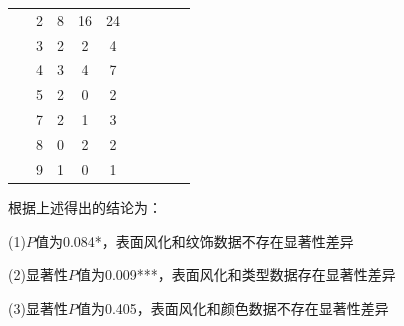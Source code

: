 \documentclass[UTF8]{ctexart}
\begin{document}
\begin{table}[H]
\begin{tabular}{|c|c|c|c|c|c|c|c|}
                        ~                     & 2                     & 8                              & 16                    & 24                  & ~                       & ~                      & ~                         \\ \cline{2-5}
                        ~                     & 3                     & 2                              & 2                     & 4                   & ~                       & ~                      & ~                         \\ \cline{2-5}
                        ~                     & 4                     & 3                              & 4                     & 7                   & ~                       & ~                      & ~                         \\\cline{2-5}
                        ~                     & 5                     & 2                              & 0                     & 2                   & ~                       & ~                      & ~                         \\ \cline{2-5}
                        ~                     & 7                     & 2                              & 1                     & 3                   & ~                       & ~                      & ~                         \\ \cline{2-5}
                        ~                     & 8                     & 0                              & 2                     & 2                   & ~                       & ~                      & ~                         \\ \cline{2-5}
                        ~                     & 9                     & 1                              & 0                     & 1                   & ~                       & ~                      & ~                         \\ \hline
                    \end{tabular}
                \end{table}



                根据上述得出的结论为：

                (1)$P$值为0.084*，表面风化和纹饰数据不存在显著性差异

                (2)显著性$P$值为0.009***，表面风化和类型数据存在显著性差异

                (3)显著性$P$值为0.405，表面风化和颜色数据不存在显著性差异
\end{document}
